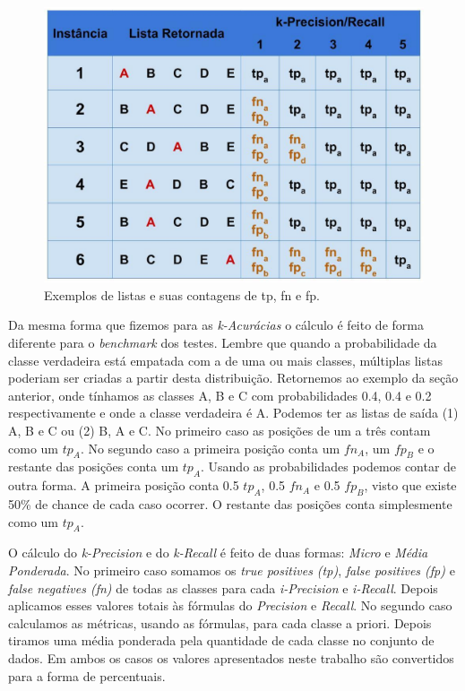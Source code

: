 \begin{figure}[h!]
  \centering
  \includegraphics[width=120mm,scale=0.8]{images/descricaodostestes02.eps}
  \caption{Exemplos de listas e suas contagens de tp, fn e fp.}
  \label{fig:descricaodostestes02}
\end{figure}

Da mesma forma que fizemos para as \textit{k-Acurácias} o cálculo é feito de forma diferente para o \textit{benchmark} dos testes.
Lembre que quando a probabilidade da classe verdadeira está empatada com a de uma ou mais classes, múltiplas listas poderiam ser criadas a partir desta distribuição.
Retornemos ao exemplo da seção anterior, onde tínhamos as classes A, B e C com probabilidades 0.4, 0.4 e 0.2 respectivamente e onde a classe verdadeira é A.
Podemos ter as listas de saída (1) A, B e C ou (2) B, A e C.
No primeiro caso as posições de um a três contam como um $tp_A$.
No segundo caso a primeira posição conta um $fn_A$, um $fp_B$ e o restante das posições conta um $tp_A$.
Usando as probabilidades podemos contar de outra forma.
A primeira posição conta 0.5 $tp_A$, 0.5 $fn_A$ e 0.5 $fp_B$, visto que existe 50\% de chance de cada caso ocorrer.
O restante das posições conta simplesmente como um $tp_A$.

O cálculo do \textit{k-Precision} e do \textit{k-Recall} é feito de duas formas: \textit{Micro} e \textit{Média Ponderada}.
No primeiro caso somamos os \textit{true positives (tp)}, \textit{false positives (fp)} e \textit{false negatives (fn)} de todas as classes para cada \textit{i-Precision} e \textit{i-Recall}.
Depois aplicamos esses valores totais às fórmulas do \textit{Precision} e \textit{Recall}.
No segundo caso calculamos as métricas, usando as fórmulas, para cada classe a priori.
Depois tiramos uma média ponderada pela quantidade de cada classe no conjunto de dados.
Em ambos os casos os valores apresentados neste trabalho são convertidos para a forma de percentuais.

